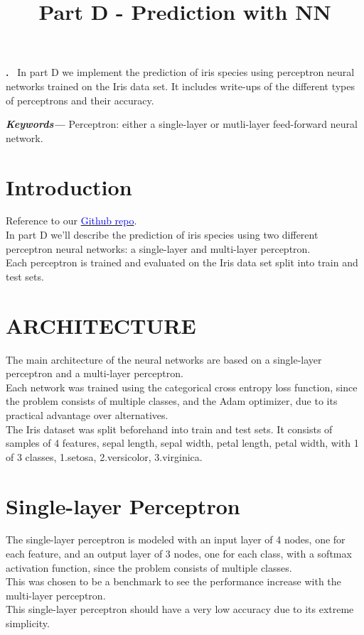\documentclass[12pt]{article}
\renewenvironment{abstract}
 {\par\noindent\textbf{\abstractname.}\ \ignorespaces}
 {\par\medskip}
\providecommand{\keywords}[1]
{
  \small	
  \textbf{\textit{Keywords---}} #1
}
\begin{document}
\title{Part D - Prediction with NN}



\maketitle
\tableofcontents

\newpage

\begin{abstract}
In part D we implement the prediction of iris species using perceptron neural networks trained on the Iris data set. It includes write-ups of the different types of perceptrons and their accuracy.

\end{abstract}

\keywords{Perceptron: either a single-layer or mutli-layer feed-forward neural network.}



\section{Introduction}
Reference to our \href{https://github.com/assiakhateeb/PPML_lab/tree/main/part\%20D}{\textcolor{blue}{Github repo}}.\\
In part D we'll  describe the                 
prediction of iris species using two different   perceptron neural networks: a single-layer and multi-layer perceptron.\\ Each perceptron is trained and evaluated on the Iris data set split into train and test sets. 

\section{\small{ARCHITECTURE}}
The main architecture of the neural networks are based on a single-layer perceptron and a multi-layer perceptron.\\
Each network was trained using the             
categorical cross entropy loss function, since the problem consists of multiple classes, and the Adam optimizer, due to its practical advantage over alternatives. \\
The Iris dataset was split beforehand into train and test sets. It consists of samples of 4 features, sepal length, sepal width, petal length, petal width, with 1 of 3 classes, 1.setosa,               
2.versicolor,
3.virginica.

\section{Single-layer Perceptron}
The single-layer perceptron is modeled with an             
input layer of 4 nodes, one for each feature, and an                     
output layer of 3 nodes, one for each class, with a                     
softmax activation function, since the problem           
consists of multiple classes.\\ This was chosen to be a                   
benchmark to see the performance increase with the               
multi-layer perceptron.\\ This single-layer perceptron should have a very low accuracy due to its extreme                   
simplicity.    
\end{document}
